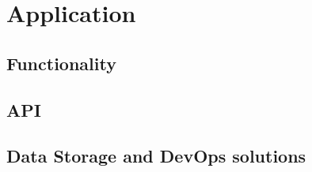 \chapter{Application}

\section{Functionality}
\section{API}
\section{Data Storage and DevOps solutions}

